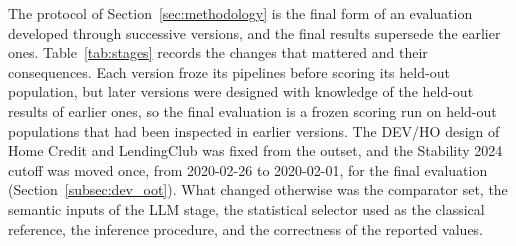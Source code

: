 \documentclass[final,5p,twocolumn]{elsarticle}
\providecommand{\DIFaddtex}[1]{{\protect\color{blue} \sf #1}} %
\providecommand{\DIFadd}[1]{\texorpdfstring{\DIFaddtex{#1}}{#1}} %
\begin{document}
\DIFadd{The protocol of Section~\ref{sec:methodology} is the final form of an evaluation developed through successive versions, and the final results supersede the earlier ones. Table~\ref{tab:stages} records the changes that mattered and their consequences. Each version froze its pipelines before scoring its held-out population, but later versions were designed with knowledge of the held-out results of earlier ones, so the final evaluation is a frozen scoring run on held-out populations that had been inspected in earlier versions. The DEV/HO design of Home Credit and LendingClub was fixed from the outset, and the Stability 2024 cutoff was moved once, from 2020-02-26 to 2020-02-01, for the final evaluation (Section~\ref{subsec:dev_oot}). What changed otherwise was the comparator set, the semantic inputs of the LLM stage, the statistical selector used as the classical reference, the inference procedure, and the correctness of the reported values.
}
\end{document}
